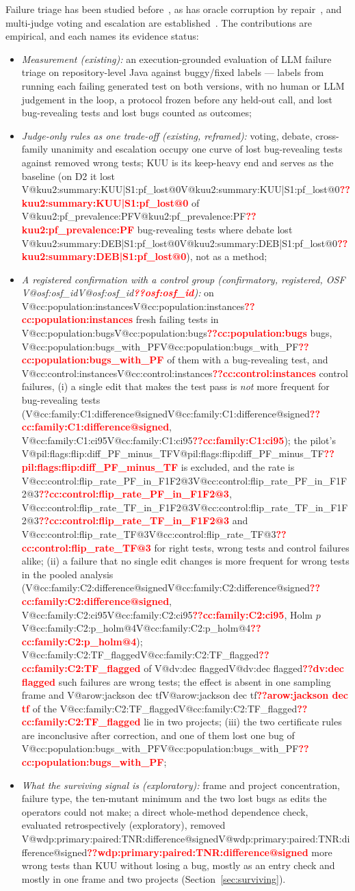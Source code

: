 \documentclass[pdflatex,iicol,sn-mathphys-num]{sn-jnl}
\makeatletter
\newcommand{\V}[1]{\ifcsname V@#1\endcsname\csname V@#1\endcsname\else\textbf{\textcolor{red}{??#1}}\fi}
\makeatother
\begin{document}
Failure triage has been studied before~\cite{liu2026jstestcraft,maddila2026agentic,fu2026javaoracle,herzig2015alarms,jiang2017alarm}, as has oracle corruption by repair~\cite{mathews2026validate,zhao2026misguidance,li2026selfrepair}, and multi-judge voting and escalation are established~\cite{wang2025json,becker2026jit,zhang2026testagent}. The contributions are empirical, and each names its evidence status:
\begin{itemize}
\item \emph{Measurement (existing):} an execution-grounded evaluation of LLM failure triage on repository-level Java against buggy/fixed labels --- labels from running each failing generated test on both versions, with no human or LLM judgement in the loop, a protocol frozen before any held-out call, and lost bug-revealing tests and lost bugs counted as outcomes;
\item \emph{Judge-only rules as one trade-off (existing, reframed):} voting, debate, cross-family unanimity and escalation occupy one curve of lost bug-revealing tests against removed wrong tests; KUU is its keep-heavy end and serves as the baseline (on D2 it lost \V{kuu2:summary:KUU|S1:pf_lost@0} of \V{kuu2:pf_prevalence:PF} bug-revealing tests where debate lost \V{kuu2:summary:DEB|S1:pf_lost@0}), not as a method;
\item \emph{A registered confirmation with a control group (confirmatory, registered, OSF \V{osf:osf_id}):} on \V{cc:population:instances} fresh failing tests in \V{cc:population:bugs} bugs, \V{cc:population:bugs_with_PF} of them with a bug-revealing test, and \V{cc:control:instances} control failures, (i) a single edit that makes the test pass is \emph{not} more frequent for bug-revealing tests (\V{cc:family:C1:difference@signed}, \V{cc:family:C1:ci95}); the pilot's \V{pil:flags:flip:diff_PF_minus_TF} is excluded, and the rate is \V{cc:control:flip_rate_PF_in_F1F2@3}, \V{cc:control:flip_rate_TF_in_F1F2@3} and \V{cc:control:flip_rate_TF@3} for right tests, wrong tests and control failures alike; (ii) a failure that no single edit changes is more frequent for wrong tests in the pooled analysis (\V{cc:family:C2:difference@signed}, \V{cc:family:C2:ci95}, Holm $p$ \V{cc:family:C2:p_holm@4}); \V{cc:family:C2:TF_flagged} of \V{dv:dec flagged} such failures are wrong tests; the effect is absent in one sampling frame and \V{arow:jackson dec tf} of the \V{cc:family:C2:TF_flagged} lie in two projects; (iii) the two certificate rules are inconclusive after correction, and one of them lost one bug of \V{cc:population:bugs_with_PF};
\item \emph{What the surviving signal is (exploratory):} frame and project concentration, failure type, the ten-mutant minimum and the two lost bugs as edits the operators could not make; a direct whole-method dependence check, evaluated retrospectively (exploratory), removed \V{wdp:primary:paired:TNR:difference@signed} more wrong tests than KUU without losing a bug, mostly as an entry check and mostly in one frame and two projects (Section~\ref{sec:surviving}).
\end{itemize}
\end{document}
